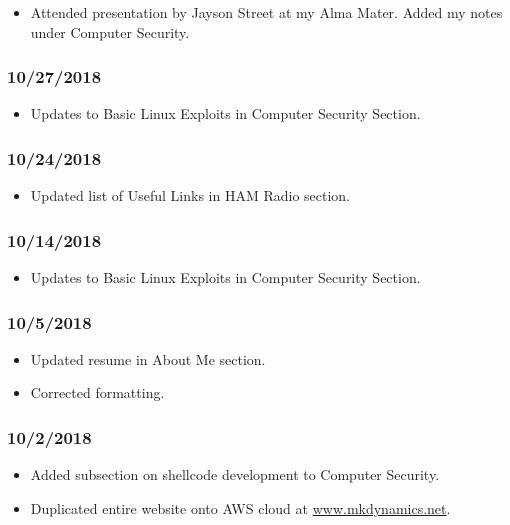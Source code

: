 \begin{itemize}
\item Attended presentation by Jayson Street at my Alma Mater. Added my notes under Computer Security.
\end{itemize}

\subsubsection{10/27/2018}

\begin{itemize}
\item Updates to Basic Linux Exploits in Computer Security Section.
\end{itemize}

\subsubsection{10/24/2018}

\begin{itemize}
\item Updated list of Useful Links in HAM Radio section.
\end{itemize}

\subsubsection{10/14/2018}

\begin{itemize}
\item Updates to Basic Linux Exploits in Computer Security Section.
\end{itemize}

\subsubsection{10/5/2018}

\begin{itemize}
\item Updated resume in About Me section.
\item Corrected formatting.
\end{itemize}

\subsubsection{10/2/2018}

\begin{itemize}
\item Added subsection on shellcode development to Computer Security.
\item Duplicated entire website onto AWS cloud at \href{http://www.mkdynamics.net}{www.mkdynamics.net}.
\end{itemize}


